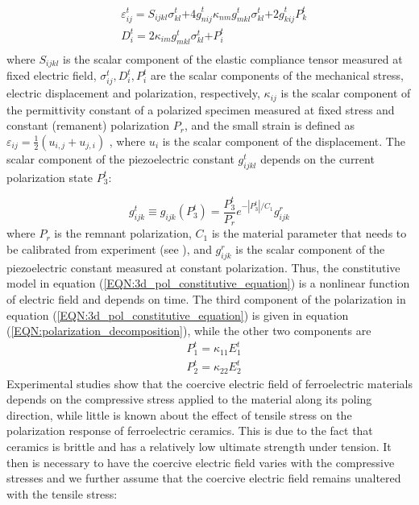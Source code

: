 \begin{equation}
\begin{aligned}
&{ {\varepsilon }}_{{ {ij}}}^{ {t}}{ { = }}{{ {S}}_{{ {ijkl}}}}{ {\sigma }}_{{ {kl}}}^{ {t}}{ { + 4g}}_{{ {nij}}}^{ {t}}{{ {\kappa }}_{{ {nm}}}}{ {g}}_{{ {mkl}}}^{ {t}}{ {\sigma }}_{{ {kl}}}^{ {t}}{ { + 2 g}}_{{ {kij}}}^{ {t}}{ {P}}_{ {k}}^{ {t}} \\
&{ {D}}_{ {i}}^{ {t}}{ { = 2}}{{ {\kappa }}_{{ {im}}}}{ {g}}_{{ {mkl}}}^{ {t}}{ {\sigma }}_{{ {kl}}}^{ {t}}{ { + P}}_{ {i}}^{ {t}}\\
\end{aligned}
\label{EQN:3d_pol_constitutive_equation}
\end{equation}
where $S_{ijkl}$ is the scalar component of the elastic compliance tensor measured at fixed electric field,
$\sigma^t_{ij}, D^t_i, P^t_i$  are the scalar components of the mechanical stress,
 electric displacement and polarization, respectively,
 $\kappa_{ij}$  is the scalar component of the permittivity constant of a polarized specimen measured at fixed stress and constant (remanent) polarization
 $P_r$, and the small strain is defined as ${\varepsilon _{ij}} = \frac{1}{2}\left( {{u_{i,j}} + {u_{j,i}}} \right)$ , where $u_{i}$ is the scalar component of the displacement. The scalar component of the piezoelectric constant $g^t_{ijkl}$ depends on the current polarization state $P^t_3$:

\begin{equation}
g_{ijk}^t \equiv {g_{ijk}}(P_3^t) = \frac{{P_3^t}}{{{P_r}}}{e^{ - \left| {P_3^t} \right|/{C_1}}}g_{ijk}^r
\label{EQN:3d_piezo_electric_comstant_g}
\end{equation}
where $P_r$ is the remnant polarization, $C_1$ is the material parameter that needs to be calibrated from experiment (see \cite{Muliana2011}), and $g_{ijk}^r$ is the scalar component of the piezoelectric constant measured at constant polarization. 
 Thus, the constitutive model in equation (\ref{EQN:3d_pol_constitutive_equation}) is a nonlinear function of electric field and depends on time. 
 The third component of the polarization  in equation (\ref{EQN:3d_pol_constitutive_equation}) is given in equation (\ref{EQN:polarization_decomposition}),
  while the other two components are 
\begin{equation}
\begin{aligned}
& P_1^t = {\kappa _{11}}E_1^t \\
& P_2^t = {\kappa _{22}}E_2^t
\end{aligned}
\label{EQN:other_components_of_pr} 
\end{equation}  
Experimental studies show that the coercive electric field of ferroelectric materials depends on the compressive stress applied to the material along its poling direction,
 while little is known about the effect of tensile stress on the polarization response of ferroelectric ceramics. 
 This is due to the fact that ceramics is brittle and has a relatively low ultimate strength under tension. 
 It then is necessary to have the coercive electric field varies with the compressive stresses and we further assume that the coercive electric field remains unaltered with the tensile stress:

